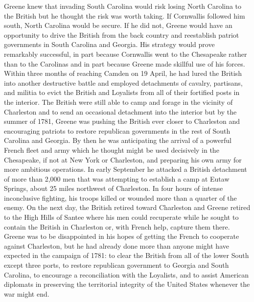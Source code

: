 Greene knew that invading South Carolina would risk losing North Carolina to the
British but he thought the risk was worth taking. If Cornwallis followed him south, North
Carolina would be secure. If he did not, Greene would have an opportunity to drive the
British from the back country and reestablish patriot governments in South Carolina and
Georgia. His strategy would prove remarkably successful, in part because Cornwallis went
to the Chesapeake rather than to the Carolinas and in part because Greene made skillful use
of his forces. Within three months of reaching Camden on 19 April, he had lured the British
into another destructive battle and employed detachments of cavalry, partisans, and militia
to evict the British and Loyalists from all of their fortified posts in the interior. The British
were still able to camp and forage in the vicinity of Charleston and to send an occasional
detachment into the interior but by the summer of 1781, Greene was pushing the British
ever closer to Charleston and encouraging patriots to restore republican governments in the
rest of South Carolina and Georgia. By then he was anticipating the arrival of a powerful
French fleet and army which he thought might be used decisively in the Chesapeake, if not
at New York or Charleston, and preparing his own army for more ambitious operations.
In early September he attacked a British detachment of more than 2,000 men that was
attempting to establish a camp at Eutaw Springs, about 25 miles northwest of Charleston.
In four hours of intense inconclusive fighting, his troops killed or wounded more than a
quarter of the enemy. On the next day, the British retired toward Charleston and Greene
retired to the High Hills of Santee where his men could recuperate while he sought to
contain the British in Charleston or, with French help, capture them there. Greene was to be
disappointed in his hopes of getting the French to cooperate against Charleston, but he had
already done more than anyone might have expected in the campaign of 1781: to clear the
British from all of the lower South except three ports, to restore republican government to
Georgia and South Carolina, to encourage a reconciliation with the Loyalists, and to assist
American diplomats in preserving the territorial integrity of the United States whenever
the war might end.

